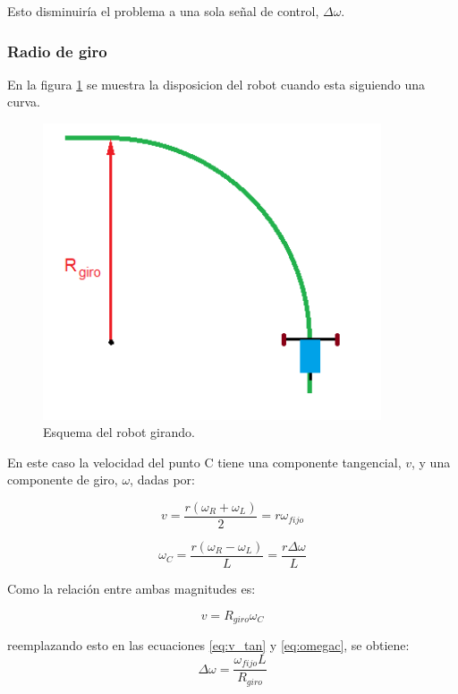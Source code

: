 \documentclass[10pt,conference,a4paper,onecolumn]{article}%
\begin{document}
Esto disminuiría el problema a una sola señal de control, $\Delta \omega$.

\subsubsection{Radio de giro}
En la figura \ref{fig:girando} se muestra la disposicion del robot cuando esta siguiendo una curva.
\begin{figure}[h]
\centering
\includegraphics[width=10cm]{./imagenes/carrito_girando.png}
\caption{Esquema del robot girando.}
\label{fig:girando}
\end{figure}
En este caso la velocidad del punto C tiene una componente tangencial, $v$, y una componente de giro, $\omega$, dadas por: 

\begin{equation}
v =\frac{r(\omega _R + \omega _L) }{2}=r \omega_{fijo}
\label{eq:v_tan}
\end{equation}

\begin{equation}
\omega_{C} =\frac{r(\omega _R - \omega _L) }{L}= \frac{  r \Delta \omega} {L}
\label{eq:omegac}
\end{equation}

Como la relación entre ambas magnitudes es:


\begin{equation*}
v=R_{giro} \omega_{C}
\end{equation*}

reemplazando esto en las ecuaciones \ref{eq:v_tan}  y \ref{eq:omegac}, se obtiene:
\begin{equation}
\Delta \omega= \frac{\omega_{fijo}L}{R_{giro}}
\end{equation}
\end{document}
